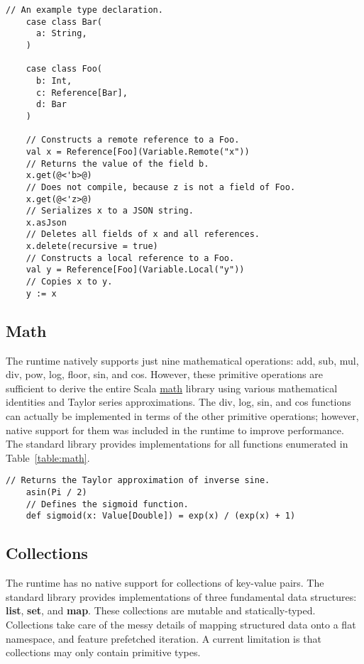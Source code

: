 \documentclass[../main.tex]{subfiles}
\begin{document}
  \begin{lstlisting}[style=Scala]
    // An example type declaration.
    case class Bar(
      a: String,
    )

    case class Foo(
      b: Int,
      c: Reference[Bar],
      d: Bar
    )

    // Constructs a remote reference to a Foo.
    val x = Reference[Foo](Variable.Remote("x"))
    // Returns the value of the field b.
    x.get(@<'b>@)
    // Does not compile, because z is not a field of Foo.
    x.get(@<'z>@)
    // Serializes x to a JSON string.
    x.asJson
    // Deletes all fields of x and all references.
    x.delete(recursive = true)
    // Constructs a local reference to a Foo.
    val y = Reference[Foo](Variable.Local("y"))
    // Copies x to y.
    y := x
  \end{lstlisting}

  \subsection{Math}
  The runtime natively supports just nine mathematical operations: add, sub, mul, div, pow,
  log, floor, sin, and cos. However, these primitive operations are sufficient to derive the
  entire Scala \href{https://www.scala-lang.org/api/2.12.1/scala/math/index.html}{math} library using
  various mathematical identities and Taylor series approximations. The div, log, sin, and
  cos functions can actually be implemented in terms of the other primitive operations; however,
  native support for them was included in the runtime to improve performance. The standard library
  provides implementations for all functions enumerated in Table~\ref{table:math}.

  \begin{lstlisting}[style=Scala]
    // Returns the Taylor approximation of inverse sine.
    asin(Pi / 2)
    // Defines the sigmoid function.
    def sigmoid(x: Value[Double]) = exp(x) / (exp(x) + 1)
  \end{lstlisting}

  \subsection{Collections}
  The runtime has no native support for collections of key-value pairs. The standard library
  provides implementations of three fundamental data structures: \textbf{list}, \textbf{set},
  and \textbf{map}. These collections are mutable and statically-typed. Collections take care of the
  messy details of mapping structured data onto a flat namespace, and feature prefetched iteration.
  A current limitation is that collections may only contain primitive types.
\end{document}
